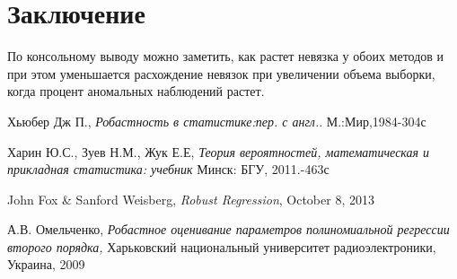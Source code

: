\documentclass[12pt]{article}
\begin{document}
\section{Заключение}
По консольному выводу можно заметить, как растет невязка у обоих методов и при этом уменьшается расхождение невязок при увеличении объема выборки, когда процент аномальных наблюдений растет.
\newpage
\begin{thebibliography}{9}
    Хьюбер Дж П.,
    \textit{Робастность в статистике:пер. с англ.}.
    М.:Мир,1984-304с

    Харин Ю.С., Зуев Н.М., Жук Е.Е,
    \textit{Теория вероятностей, математическая и прикладная статистика: учебник}
    Минск: БГУ, 2011.-463с

    John Fox \& Sanford Weisberg,
    \textit{Robust Regression},
    October 8, 2013

    А.В. Омельченко,
    \textit{Робастное оценивание параметров полиномиальной регрессии второго порядка,}
    Харьковский национальный университет радиоэлектроники, Украина, 2009
\end{thebibliography}
\end{document}
